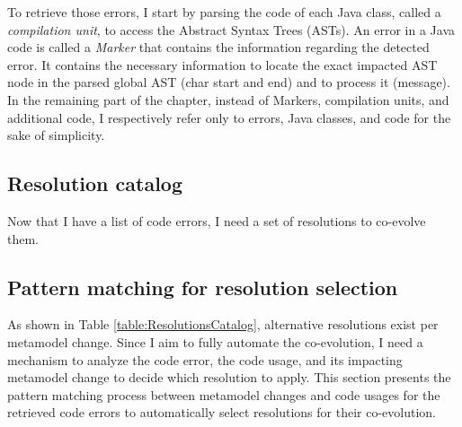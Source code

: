 To retrieve those errors, I start by parsing the code of each Java class, called a \emph{compilation unit}, to access the Abstract Syntax Trees (ASTs). An error in a Java code is called a \emph{Marker} that contains the information regarding the detected error. It contains the necessary information to locate the exact impacted AST node in the parsed global AST (\ie char start and end) and  to process it (\ie message).
In the remaining part of the chapter, instead of Markers, compilation units, and additional code, I respectively refer only to errors, Java classes, and code for the sake of simplicity.  

\subsection{Resolution catalog}

Now that I have a list of code errors, I need a set of resolutions to co-evolve them.

\subsection{Pattern matching for resolution selection}
\label{pattern_matching}




As shown in Table \ref{table:ResolutionsCatalog}, alternative resolutions exist per metamodel change. Since I aim to fully automate the co-evolution, I need a mechanism to analyze the code error, the code usage, and its impacting metamodel change to decide which resolution to apply. 
This section presents the pattern matching process between metamodel changes and code usages for the retrieved code errors to automatically select resolutions for their co-evolution.

